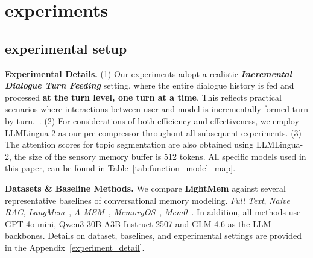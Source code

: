 
\section{experiments}

\subsection{experimental setup}
\noindent \textbf{Experimental Details.}
(1) Our experiments adopt a realistic \textbf{\textit{Incremental Dialogue Turn Feeding}} setting, where the entire dialogue history is fed and processed \textbf{at the turn level, one turn at a time}. 
This reflects practical scenarios where interactions between user and model is incrementally formed turn by turn.~\citep{hu2025evaluatingmemoryllmagents}.
(2) For considerations of both efficiency and effectiveness, we employ LLMLingua-2 as our pre-compressor throughout all subsequent experiments. 
(3) The attention scores for topic segmentation are also obtained using LLMLingua-2, the size of the sensory memory buffer is 512 tokens. 
All specific models used in this paper, can be found in Table~\ref{tab:function_model_map}. 

\noindent \textbf{Datasets \& Baseline Methods.}
We compare \textbf{LightMem} against several representative baselines of conversational memory modeling. 
 \textit{Full Text}, 
 \textit{Naive RAG}, 
 \textit{LangMem}~\citep{LangMemBlog},
 \textit{A-MEM}~\citep{Xu2025AMEMAM}, 
 \textit{MemoryOS}~\citep{Kang2025MemoryOO}, 
 \textit{Mem0}~\citep{Chhikara2025Mem0BP}. 
In addition, all methods use GPT-4o-mini, Qwen3-30B-A3B-Instruct-2507 and GLM-4.6 as the LLM backbones.
Details on dataset, baselines, and experimental settings are provided in the Appendix~\ref{experiment_detail}. 

